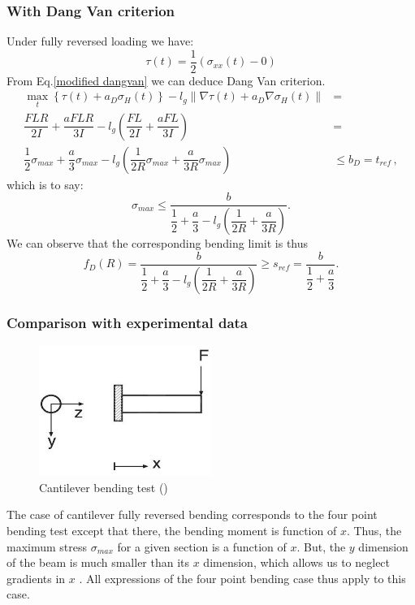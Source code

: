 \subsubsection{With Dang Van criterion}  
Under fully reversed loading we have:
$$\tau(t)=\dfrac{1}{2}(\sigma_{xx}(t)-0)$$ 
From Eq.\eqref{modified dangvan} we can deduce Dang Van criterion.
\begin{equation}
	\begin{split}
		\max \limits_{t}\left\{\tau{(t)}+a_D\sigma_H(t)\right\}-l_g\parallel{\nabla\tau{(t)}}+a_D\nabla\sigma_H(t)\parallel&=\\ \dfrac{FLR}{2I} +\dfrac{aFLR}{3I}-l_g\left( \dfrac{FL}{2I}+\dfrac{aFL}{3I}\right) &=\\ \dfrac{1}{2}\sigma_{max}+\dfrac{a}{3}\sigma_{max}-l_g\left( \dfrac{1}{2R}\sigma_{max}+\dfrac{a}{3R}\sigma_{max}\right) &\leqslant b_D= t_{ref}\, ,
	\end{split}
\end{equation}
which is to say:
\begin{equation}
	\sigma_{max}\leqslant\dfrac{b}{\dfrac{1}{2}+\dfrac{a}{3}-l_g\left( \dfrac{1}{2R}+\dfrac{a}{3R}\right) }.
\end{equation}
We can observe that the corresponding bending limit is thus
\begin{equation}f_D(R)=\dfrac{b}{\dfrac{1}{2}+\dfrac{a}{3}-l_g\left( \dfrac{1}{2R}+\dfrac{a}{3R}\right) }\geqslant s_{ref} = \dfrac{b}{\dfrac{1}{2}+\dfrac{a}{3}}.
\end{equation}


\subsubsection{Comparison with experimental data}
\begin{figure}[!h]
	\begin{center}
		\includegraphics[width=0.5\textwidth]{figures//fig3.jpg} 
		\caption{Cantilever bending test (\cite{Papadopoulos1996513})}
		\label{fig9}
	\end{center}
\end{figure}
The case of cantilever fully reversed bending corresponds to the four point bending test except that there, the bending moment is function of $x$. Thus, the maximum stress $\sigma_{max}$ for a given section is a function of $x$. But, the $y$ dimension of the beam is much smaller than its $x$ dimension, which allows us to neglect gradients in $x$ . All  expressions of the four point bending case thus  apply to this case. 

